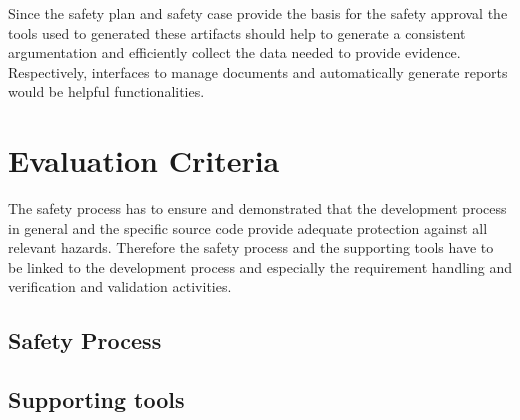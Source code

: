 \documentclass{template/openetcs_article}
\begin{document}
Since the safety plan and safety case provide the basis for the safety approval the tools used to generated these artifacts should help to generate a consistent argumentation and efficiently collect the data needed to provide evidence. Respectively, interfaces to manage documents and automatically generate reports would be helpful functionalities.

\section{Evaluation Criteria}

The safety process has to ensure and demonstrated that the development process in general and the specific source code provide adequate protection against all relevant hazards. Therefore the safety process and the supporting tools have to be linked to the development process and especially the requirement handling and verification and validation activities.

\subsection{Safety Process}



\subsection{Supporting tools}


\nocite{*}






\begin{thebibliography}{9}



\end{thebibliography}

\end{document}
